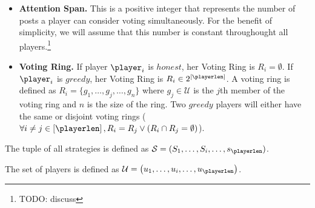 \begin{definition}[Player]
\begin{itemize}
\begin{itemize}
      \item \textbf{Attention Span.} This is a positive integer that
      represents the number of posts a player can consider voting
      simultaneously. For the benefit of simplicity, we will assume that this
      number is constant throughought all players.\footnote{TODO: discuss}

      \item \textbf{Voting Ring.}  If player $\player_i$ is $honest$, her
      Voting Ring is $R_i = \emptyset$. If $\player_i$ is $greedy$, her
      Voting Ring is $R_i \in 2^{\left[\playerlen\right]}$. A voting ring is
      defined as $R_i = \lbrace g_1, \dots, g_j, \dots, g_n \rbrace$ where
      $g_j \in \mathcal{U}$ is the $j$th member of the voting ring and $n$
      is the size of the ring. Two $greedy$ players will either have the
      same or disjoint voting rings ($\forall i \neq j \in
      \left[\playerlen\right], R_i = R_j \vee \left(R_i \cap R_j =
      \emptyset\right)$).
    \end{itemize}
    The tuple of all strategies is defined as $\mathcal{S} = (S_1, \dots,
    S_i, \dots, s_\playerlen)$.
  \end{itemize}
  The set of players is defined as $\mathcal{U} = \left(u_1, \dots, u_i,
  \dots, u_\playerlen\right)$.
\end{definition}
